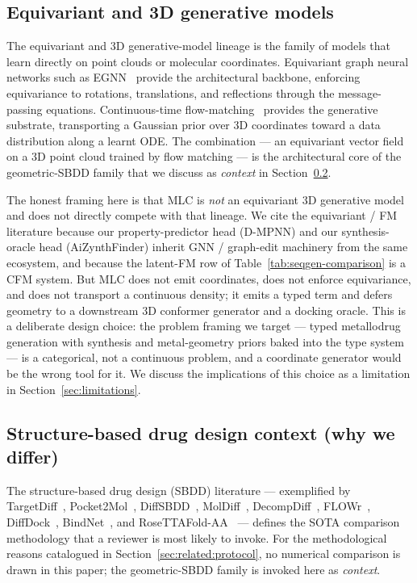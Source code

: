 \subsection{Equivariant and 3D generative models}
\label{sec:related:equiv}

The equivariant and 3D generative-model lineage is the family of
models that learn directly on point clouds or molecular
coordinates. Equivariant graph neural networks such as
EGNN~\cite{footnote:egnn_satorras} provide the architectural
backbone, enforcing equivariance to rotations, translations, and
reflections through the message-passing equations. Continuous-time
flow-matching~\cite{footnote:cfm_lipman} provides the generative
substrate, transporting a Gaussian prior over 3D coordinates toward
a data distribution along a learnt ODE. The combination --- an
equivariant vector field on a 3D point cloud trained by flow
matching --- is the architectural core of the geometric-SBDD
family that we discuss as \emph{context} in
Section~\ref{sec:related:lambda}.

The honest framing here is that MLC is \emph{not} an equivariant
3D generative model and does not directly compete with that
lineage. We cite the equivariant / FM literature because our
property-predictor head (D-MPNN) and our synthesis-oracle head
(AiZynthFinder) inherit GNN / graph-edit machinery from the same
ecosystem, and because the latent-FM row of
Table~\ref{tab:seqgen-comparison} is a CFM system. But MLC does
not emit coordinates, does not enforce equivariance, and does
not transport a continuous density; it emits a typed term and
defers geometry to a downstream 3D conformer generator and a
docking oracle. This is a deliberate design choice: the
problem framing we target --- typed metallodrug generation with
synthesis and metal-geometry priors baked into the type system
--- is a categorical, not a continuous problem, and a coordinate
generator would be the wrong tool for it. We discuss the
implications of this choice as a limitation in
Section~\ref{sec:limitations}.

\subsection{Structure-based drug design context (why we differ)}
\label{sec:related:lambda}

The structure-based drug design (SBDD) literature --- exemplified by
TargetDiff~\cite{footnote:targetdiff}, Pocket2Mol~\cite{footnote:pocket2mol},
DiffSBDD~\cite{footnote:diffsbdd}, MolDiff~\cite{footnote:moldiff},
DecompDiff~\cite{footnote:decompdiff}, FLOWr~\cite{footnote:flowr},
DiffDock~\cite{footnote:diffdock}, BindNet~\cite{footnote:bindnet}, and
RoseTTAFold-AA~\cite{footnote:rosettafoldaa} --- defines the SOTA
comparison methodology that a reviewer is most likely to invoke.
For the methodological reasons catalogued in
Section~\ref{sec:related:protocol}, no numerical comparison is drawn
in this paper; the geometric-SBDD family is invoked here as
\emph{context}.

